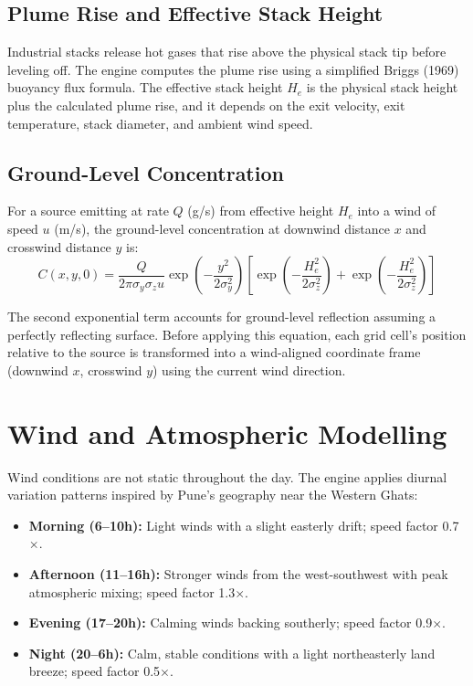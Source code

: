 \documentclass[a4paper, 12pt]{report}
\begin{document}
\subsection{Plume Rise and Effective Stack Height}
Industrial stacks release hot gases that rise above the physical stack tip before leveling off. The engine computes the plume rise using a simplified Briggs (1969) buoyancy flux formula. The effective stack height $H_e$ is the physical stack height plus the calculated plume rise, and it depends on the exit velocity, exit temperature, stack diameter, and ambient wind speed.

\subsection{Ground-Level Concentration}
For a source emitting at rate $Q$ (g/s) from effective height $H_e$ into a wind of speed $u$ (m/s), the ground-level concentration at downwind distance $x$ and crosswind distance $y$ is:
\begin{equation}
C(x,y,0) = \frac{Q}{2\pi \sigma_y \sigma_z u} \exp\!\left(-\frac{y^2}{2\sigma_y^2}\right) \left[\exp\!\left(-\frac{H_e^2}{2\sigma_z^2}\right) + \exp\!\left(-\frac{H_e^2}{2\sigma_z^2}\right)\right]
\end{equation}

The second exponential term accounts for ground-level reflection assuming a perfectly reflecting surface. Before applying this equation, each grid cell's position relative to the source is transformed into a wind-aligned coordinate frame (downwind $x$, crosswind $y$) using the current wind direction.

\section{Wind and Atmospheric Modelling}
Wind conditions are not static throughout the day. The engine applies diurnal variation patterns inspired by Pune's geography near the Western Ghats:

\begin{itemize}
\item \textbf{Morning (6--10h):} Light winds with a slight easterly drift; speed factor 0.7$\times$.
\item \textbf{Afternoon (11--16h):} Stronger winds from the west-southwest with peak atmospheric mixing; speed factor 1.3$\times$.
\item \textbf{Evening (17--20h):} Calming winds backing southerly; speed factor 0.9$\times$.
\item \textbf{Night (20--6h):} Calm, stable conditions with a light northeasterly land breeze; speed factor 0.5$\times$.
\end{itemize}
\end{document}
